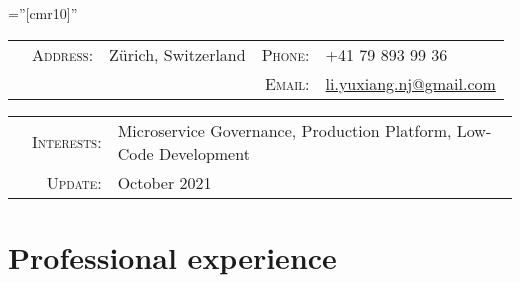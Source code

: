 \documentclass[a4paper,10pt]{article} %
\begin{document}
\pagestyle{empty} %

\font\fb=''[cmr10]'' %


\par{} %
\vspace{0.1cm}

\begin{tabular}{@{}p{0.77cm}rp{8.75cm}rl}
     & \textsc{Address:} & Zürich, Switzerland & \textsc{Phone:} & +41 79 893 99 36                                               \\
     &                   &                     & \textsc{Email:} & \href{mailto:li.yuxiang.nj@gmail.com}{li.yuxiang.nj@gmail.com}
\end{tabular}

\begin{tabular}{p{0.315cm}rl}
     & \textsc{Interests:} & Microservice Governance, Production Platform, Low-Code Development \\
     & \textsc{Update:} & October 2021
\end{tabular}


\section{Professional experience}
\end{document}
